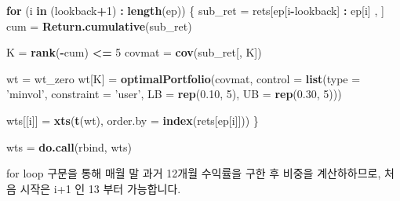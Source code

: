 \documentclass[12pt,]{book}
\newenvironment{Shaded}{\begin{snugshade}}{\end{snugshade}}
\newcommand{\ControlFlowTok}[1]{\textcolor[rgb]{0.13,0.29,0.53}{\textbf{#1}}}
\newcommand{\DataTypeTok}[1]{\textcolor[rgb]{0.13,0.29,0.53}{#1}}
\newcommand{\DecValTok}[1]{\textcolor[rgb]{0.00,0.00,0.81}{#1}}
\newcommand{\FloatTok}[1]{\textcolor[rgb]{0.00,0.00,0.81}{#1}}
\newcommand{\KeywordTok}[1]{\textcolor[rgb]{0.13,0.29,0.53}{\textbf{#1}}}
\newcommand{\NormalTok}[1]{#1}
\newcommand{\OperatorTok}[1]{\textcolor[rgb]{0.81,0.36,0.00}{\textbf{#1}}}
\newcommand{\StringTok}[1]{\textcolor[rgb]{0.31,0.60,0.02}{#1}}
\begin{document}
\begin{Shaded}
\begin{Highlighting}[]
\ControlFlowTok{for}\NormalTok{ (i }\ControlFlowTok{in}\NormalTok{ (lookback}\OperatorTok{+}\DecValTok{1}\NormalTok{) }\OperatorTok{:}\StringTok{ }\KeywordTok{length}\NormalTok{(ep)) \{}
\NormalTok{  sub_ret =}\StringTok{ }\NormalTok{rets[ep[i}\OperatorTok{-}\NormalTok{lookback] }\OperatorTok{:}\StringTok{ }\NormalTok{ep[i] , ]}
\NormalTok{  cum =}\StringTok{ }\KeywordTok{Return.cumulative}\NormalTok{(sub_ret)}
  
\NormalTok{  K =}\StringTok{ }\KeywordTok{rank}\NormalTok{(}\OperatorTok{-}\NormalTok{cum) }\OperatorTok{<=}\StringTok{ }\DecValTok{5}
\NormalTok{  covmat =}\StringTok{ }\KeywordTok{cov}\NormalTok{(sub_ret[, K])}
  
\NormalTok{  wt =}\StringTok{ }\NormalTok{wt_zero}
\NormalTok{  wt[K] =}\StringTok{ }\KeywordTok{optimalPortfolio}\NormalTok{(covmat,}
                           \DataTypeTok{control =} \KeywordTok{list}\NormalTok{(}\DataTypeTok{type =} \StringTok{'minvol'}\NormalTok{,}
                                          \DataTypeTok{constraint =} \StringTok{'user'}\NormalTok{,}
                                          \DataTypeTok{LB =} \KeywordTok{rep}\NormalTok{(}\FloatTok{0.10}\NormalTok{, }\DecValTok{5}\NormalTok{),}
                                          \DataTypeTok{UB =} \KeywordTok{rep}\NormalTok{(}\FloatTok{0.30}\NormalTok{, }\DecValTok{5}\NormalTok{)))}
  
\NormalTok{  wts[[i]] =}\StringTok{ }\KeywordTok{xts}\NormalTok{(}\KeywordTok{t}\NormalTok{(wt), }\DataTypeTok{order.by =} \KeywordTok{index}\NormalTok{(rets[ep[i]]))}
\NormalTok{\}}

\NormalTok{wts =}\StringTok{ }\KeywordTok{do.call}\NormalTok{(rbind, wts)}
\end{Highlighting}
\end{Shaded}

for loop 구문을 통해 매월 말 과거 12개월 수익률을 구한 후 비중을 계산하하므로, 처음 시작은 i+1 인 13 부터 가능합니다.
\end{document}
